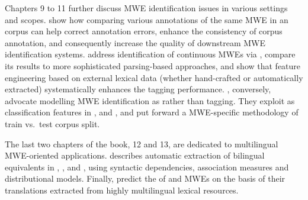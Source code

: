 \documentclass[output=paper,modfonts,]{langscibook}
\begin{document}
Chapters 9 %
to 11 %
further discuss MWE identification issues in various settings and scopes.  show how comparing various annotations of the same MWE in an  corpus can help correct annotation errors, enhance the consistency of corpus annotation, and consequently increase the quality of downstream MWE identification systems.  address identification of  continuous MWEs via , compare its results to more sophisticated parsing-based approaches, and show that feature engineering based on external lexical data (whether hand-crafted or automatically extracted) systematically enhances the tagging performance. , conversely, advocate 
modelling MWE identification as  rather than tagging. They exploit  as classification features in ,  and , and put forward a MWE-specific methodology of train vs.~test corpus split.

The last two chapters of the book, 12 %
and 13, %
are dedicated to multilingual MWE-oriented applications.  describes automatic extraction of bilingual  equivalents in , , and , using syntactic dependencies, association measures and distributional models. Finally,   predict the  of  and  MWEs on the basis of their translations extracted from highly multilingual lexical resources. 


\end{document}
